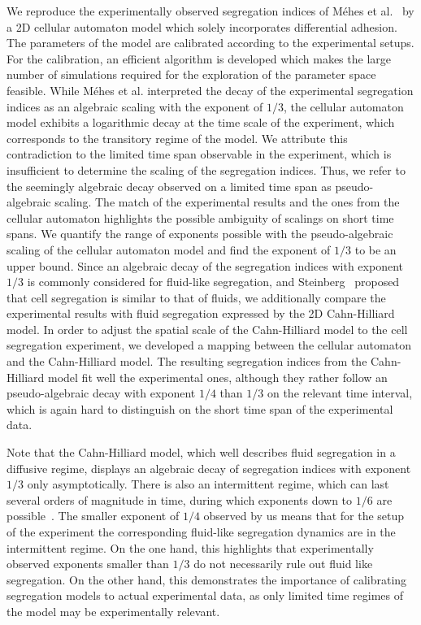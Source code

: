 \documentclass[10pt,letterpaper]{article}
\begin{document}
We reproduce the experimentally observed segregation indices of Méhes
et al.~\cite{MehMonNemVic2012} by a 2D cellular automaton model which
solely incorporates differential adhesion. The parameters of the model
are calibrated according to the experimental setups. For the
calibration, an efficient algorithm is developed which makes the large
number of simulations required for the exploration of the parameter
space feasible. While Méhes et al. interpreted the decay of the
experimental segregation indices as an algebraic scaling with the
exponent of $1/3$, the cellular automaton model exhibits a logarithmic
decay at the time scale of the experiment, which corresponds to the
transitory regime of the model. We attribute this contradiction to the
limited time span observable in the experiment, which is insufficient
to determine the scaling of the segregation indices. Thus, we refer to
the seemingly algebraic decay observed on a limited time span as
pseudo-algebraic scaling. The match of the experimental results and
the ones from the cellular automaton highlights the possible ambiguity
of scalings on short time spans. We quantify the range of exponents
possible with the pseudo-algebraic scaling of the cellular automaton
model and find the exponent of $1/3$ to be an upper bound. Since an
algebraic decay of the segregation indices with exponent $1/3$ is
commonly considered for fluid-like segregation, and
Steinberg~\cite{Ste1970} proposed that cell segregation is similar to
that of fluids, we additionally compare the experimental results with
fluid segregation expressed by the 2D Cahn-Hilliard model. In order to
adjust the spatial scale of the Cahn-Hilliard model to the cell
segregation experiment, we developed a mapping between the cellular
automaton and the Cahn-Hilliard model. The resulting segregation
indices from the Cahn-Hilliard model fit well the experimental ones,
although they rather follow an pseudo-algebraic decay with exponent $1/4$
than $1/3$ on the relevant time interval, which is again hard to
distinguish on the short time span of the experimental data.

Note that the Cahn-Hilliard model, which well describes fluid
segregation in a diffusive regime, displays an algebraic decay of
segregation indices with exponent $1/3$ only asymptotically. There is
also an intermittent regime, which can last several orders of
magnitude in time, during which exponents down to $1/6$ are
possible~\cite{GarNieRum2003}. The smaller exponent of $1/4$ observed
by us means that for the setup of the experiment the corresponding
fluid-like segregation dynamics are in the intermittent regime. On the
one hand, this highlights that experimentally observed exponents
smaller than $1/3$ do not necessarily rule out fluid like segregation.
On the other hand, this demonstrates the importance of calibrating
segregation models to actual experimental data, as only limited time
regimes of the model may be experimentally relevant.
\end{document}
